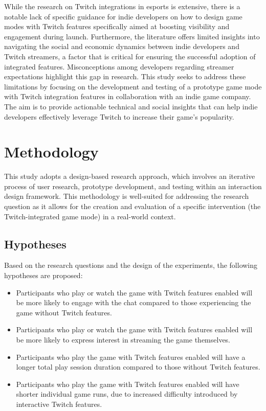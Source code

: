 \documentclass[conference]{IEEEtran}
\begin{document}
While the research on Twitch integrations in esports is extensive, there is a notable lack of specific guidance for indie developers on how to design game modes with Twitch features specifically aimed at boosting visibility and engagement during launch. Furthermore, the literature offers limited insights into navigating the social and economic dynamics between indie developers and Twitch streamers, a factor that is critical for ensuring the successful adoption of integrated features. Misconceptions among developers regarding streamer expectations highlight this gap in research. This study seeks to address these limitations by focusing on the development and testing of a prototype game mode with Twitch integration features in collaboration with an indie game company. The aim is to provide actionable technical and social insights that can help indie developers effectively leverage Twitch to increase their game's popularity.

\section{Methodology}\label{sec:methods}

This study adopts a design-based research approach, which involves an iterative process of user research, prototype development, and testing within an interaction design framework. This methodology is well-suited for addressing the research question as it allows for the creation and evaluation of a specific intervention (the Twitch-integrated game mode) in a real-world context.

\subsection{Hypotheses}
Based on the research questions and the design of the experiments, the following hypotheses are proposed:
\begin{itemize}
    \item Participants who play or watch the game with Twitch features enabled will be more likely to engage with the chat compared to those experiencing the game without Twitch features.
    \item Participants who play or watch the game with Twitch features enabled will be more likely to express interest in streaming the game themselves.
    \item Participants who play the game with Twitch features enabled will have a longer total play session duration compared to those without Twitch features.
    \item Participants who play the game with Twitch features enabled will have shorter individual game runs, due to increased difficulty introduced by interactive Twitch features.
\end{itemize}
\end{document}

